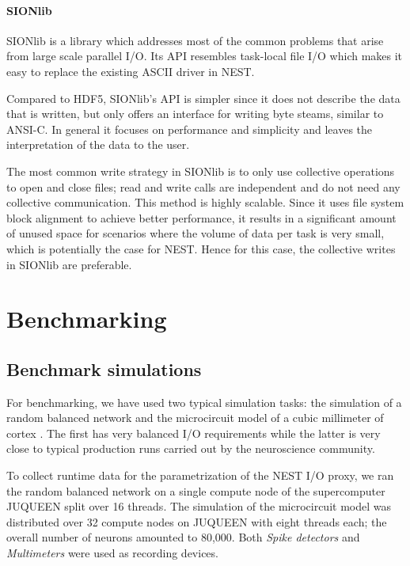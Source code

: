 \documentclass[]{YIC2015}
\begin{document}
\paragraph{SIONlib}

SIONlib \cite{frings2009scalable} is a library which addresses most of
the common problems that arise from large scale parallel I/O. Its API
resembles task-local file I/O which makes it easy to replace the
existing ASCII driver in NEST.

Compared to HDF5, SIONlib's API is simpler since it does not describe
the data that is written, but only offers an interface for writing
byte steams, similar to ANSI-C. In general it focuses on performance
and simplicity and leaves the interpretation of the data to the user.

The most common write strategy in SIONlib is to only use collective
operations to open and close files; read and write calls are
independent and do not need any collective communication. This method
is highly scalable. Since it uses file system block alignment to
achieve better performance, it results in a significant amount of
unused space for scenarios where the volume of data per task is very
small, which is potentially the case for NEST. Hence for this case,
the collective writes in SIONlib are preferable.

\section{Benchmarking}

\subsection{Benchmark simulations}\label{sect:use_cases}

For benchmarking, we have used two typical simulation tasks: the
simulation of a random balanced network \cite{morrison07} and the
microcircuit model of a cubic millimeter of cortex \cite{potjans14}.
The first has very balanced I/O requirements while the latter is very
close to typical production runs carried out by the neuroscience
community.

To collect runtime data for the parametrization of the NEST I/O proxy,
we ran the random balanced network on a single compute node of the
supercomputer JUQUEEN split over 16 threads.  The simulation of the
microcircuit model was distributed over 32 compute nodes on JUQUEEN
with eight threads each; the overall number of neurons amounted to
80,000. Both \emph{Spike detectors} and \emph{Multimeters} were used
as recording devices.
\end{document}
